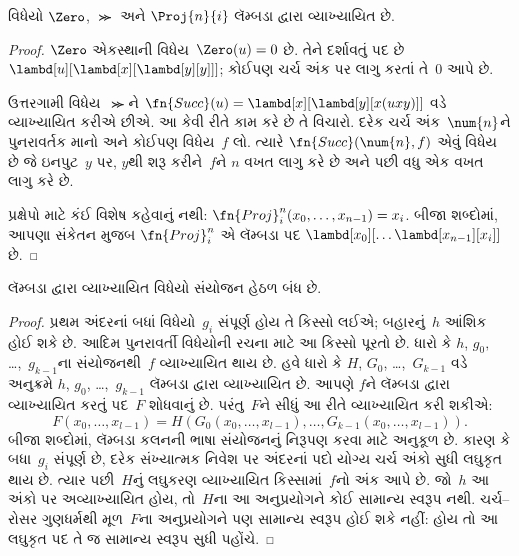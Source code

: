 \begin{lem}
વિધેયો $\Zero$, $\Succ$ અને $\Proj{n}{i}$ લૅમ્બડા દ્વારા વ્યાખ્યાયિત છે.
\end{lem}

\begin{proof}
$\Zero$ એકસ્થાની વિધેય~$\Zero(u)=0$ છે. તેને દર્શાવતું પદ છે
$\lambd[u][\lambd[x][\lambd[y][y]]]$; કોઈપણ ચર્ચ અંક પર લાગુ
કરતાં તે~$\num{0}$ આપે છે.

ઉત્તરગામી વિધેય~$\Succ$ને
$\fn{Succ}(u) = \lambd[x][\lambd[y][x(uxy)]]$ વડે વ્યાખ્યાયિત
કરીએ છીએ. આ કેવી રીતે કામ કરે છે તે વિચારો. દરેક ચર્ચ અંક~$\num{n}$ને
પુનરાવર્તક માનો અને કોઈપણ વિધેય~$f$ લો. ત્યારે
$\fn{Succ}(\num{n},f)$ એવું વિધેય છે જે ઇનપુટ~$y$ પર, $y$થી
શરૂ કરીને~$f$ને $n$ વખત લાગુ કરે છે અને પછી વધુ એક વખત લાગુ કરે છે.

પ્રક્ષેપો માટે કંઈ વિશેષ કહેવાનું નથી:
$\fn{Proj}^n_i(x_0, \dots, x_{n-1}) = x_i$. બીજા શબ્દોમાં,
આપણા સંકેતન મુજબ $\fn{Proj}^n_i$ એ લૅમ્બડા પદ
$\lambd[x_0][\dots \lambd[x_{n-1}][x_i]]$ છે.
\end{proof}
\endgroup


\begingroup
\makeatletter{}\makeatother

\label{guunit:OLP-0352}


\begin{lem}
લૅમ્બડા દ્વારા વ્યાખ્યાયિત વિધેયો સંયોજન હેઠળ બંધ છે.
\end{lem}

\begin{proof}
પ્રથમ અંદરનાં બધાં વિધેયો~$g_i$ સંપૂર્ણ હોય તે કિસ્સો લઈએ;
બહારનું~$h$ આંશિક હોઈ શકે છે. આદિમ પુનરાવર્તી વિધેયોની રચના
માટે આ કિસ્સો પૂરતો છે.
ધારો કે $h$, $g_0,$ \dots,~$g_{k-1}$ના સંયોજનથી~$f$
વ્યાખ્યાયિત થાય છે. હવે ધારો કે $H$, $G_0$, \dots,~$G_{k-1}$ વડે
અનુક્રમે $h$, $g_0$, \dots,~$g_{k-1}$ લૅમ્બડા દ્વારા વ્યાખ્યાયિત છે. આપણે
$f$ને લૅમ્બડા દ્વારા વ્યાખ્યાયિત કરતું પદ~$F$ શોધવાનું છે. પરંતુ~$F$ને
સીધું આ રીતે વ્યાખ્યાયિત કરી શકીએ:
\[
F(x_0, \dots, x_{l-1}) = H(G_0(x_0, \dots, x_{l-1}),
\dots, G_{k-1}(x_0, \dots, x_{l-1})).
\]
બીજા શબ્દોમાં, લૅમ્બડા કલનની ભાષા સંયોજનનું નિરૂપણ કરવા માટે
અનુકૂળ છે.
કારણ કે બધા~$g_i$ સંપૂર્ણ છે, દરેક સંખ્યાત્મક નિવેશ પર અંદરનાં
પદો યોગ્ય ચર્ચ અંકો સુધી લઘુકૃત થાય છે. ત્યાર પછી~$H$નું લઘુકરણ
વ્યાખ્યાયિત કિસ્સામાં~$f$નો અંક આપે છે. જો~$h$ આ અંકો પર
અવ્યાખ્યાયિત હોય, તો~$H$ના આ અનુપ્રયોગને કોઈ સામાન્ય સ્વરૂપ નથી.
ચર્ચ--રોસર ગુણધર્મથી મૂળ~$F$ના અનુપ્રયોગને પણ સામાન્ય સ્વરૂપ હોઈ
શકે નહીં: હોય તો આ લઘુકૃત પદ તે જ સામાન્ય સ્વરૂપ સુધી પહોંચે.
\end{proof}

